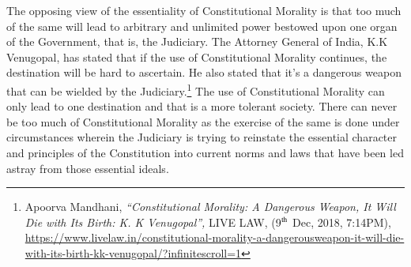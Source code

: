 \begin{multicols}{2}
\noi
The opposing view of the essentiality of Constitutional Morality is that too much of the same
will lead to arbitrary and unlimited power bestowed upon one organ of the Government, that
is, the Judiciary. The Attorney General of India, K.K Venugopal, has stated that if the use of Constitutional Morality continues, the destination will be hard to ascertain. He also stated that
it’s a dangerous weapon that can be wielded by the Judiciary.\footnote{Apoorva Mandhani, \textit{“Constitutional Morality: A Dangerous Weapon, It Will Die with Its Birth: K. K Venugopal”,} LIVE LAW, (9$^{\rm th}$ Dec, 2018, 7:14PM), \url{https://www.livelaw.in/constitutional-morality-a-dangerousweapon-it-will-die-with-its-birth-kk-venugopal/?infinitescroll=1}} The use of Constitutional
Morality can only lead to one destination and that is a more tolerant society. There can never
be too much of Constitutional Morality as the exercise of the same is done under
circumstances wherein the Judiciary is trying to reinstate the essential character and
principles of the Constitution into current norms and laws that have been led astray from
those essential ideals.



\end{multicols}
